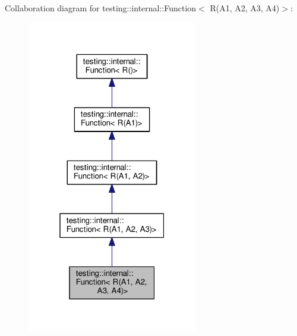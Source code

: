 Collaboration diagram for testing\+:\+:internal\+:\+:Function$<$ R(A1, A2, A3, A4)$>$\+:\nopagebreak
\begin{figure}[H]
\begin{center}
\leavevmode
\includegraphics[width=211pt]{structtesting_1_1internal_1_1Function_3_01R_07A1_00_01A2_00_01A3_00_01A4_08_4__coll__graph}
\end{center}
\end{figure}
